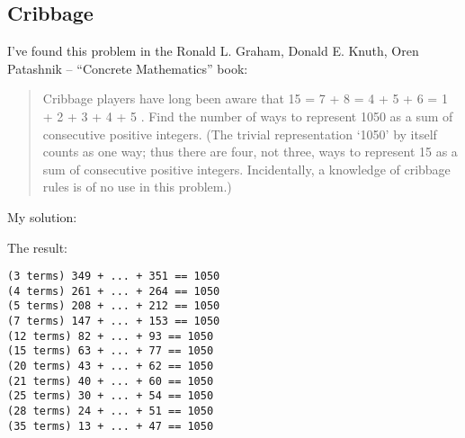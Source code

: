 \subsection{Cribbage}

I've found this problem in the Ronald L. Graham, Donald E. Knuth, Oren Patashnik -- ``Concrete Mathematics'' book:

\begin{framed}
\begin{quotation}
Cribbage players have long been aware that 15 = 7 + 8 = 4 + 5 + 6 =
1 + 2 + 3 + 4 + 5 . Find the number of ways to represent 1050 as a sum of
consecutive positive integers. (The trivial representation `1050' by itself
counts as one way; thus there are four, not three, ways to represent 15
as a sum of consecutive positive integers. Incidentally, a knowledge of
cribbage rules is of no use in this problem.)
\end{quotation}
\end{framed}

My solution:



The result:

\begin{lstlisting}
(3 terms) 349 + ... + 351 == 1050
(4 terms) 261 + ... + 264 == 1050
(5 terms) 208 + ... + 212 == 1050
(7 terms) 147 + ... + 153 == 1050
(12 terms) 82 + ... + 93 == 1050
(15 terms) 63 + ... + 77 == 1050
(20 terms) 43 + ... + 62 == 1050
(21 terms) 40 + ... + 60 == 1050
(25 terms) 30 + ... + 54 == 1050
(28 terms) 24 + ... + 51 == 1050
(35 terms) 13 + ... + 47 == 1050
\end{lstlisting}


